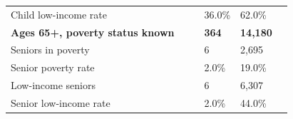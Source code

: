 \documentclass[9pt]{report}
\begin{document}
\begin{tabular}{p{.10in}p{.10in}p{.10in}p{3.7in}>{\hfill}p{.85in}>{\hfill}p{.85in}>{\hfill}p{.85in}>{\hfill}p{.85in}p{0.1in}}
\multicolumn{4}{l}{\parbox{3.6in}{\strut\raggedright{{Child low-income rate}}\strut}} &  &  & 36.0\% & 62.0\% & \multicolumn{1}{l}{}  \\ 
\multicolumn{4}{l}{\parbox{3.5in}{\strut\raggedright{\textbf{Ages 65+, poverty status known}\strut}}} & \textbf{} & \textbf{} & \textbf{364} & \textbf{14,180} & \textbf{} \\ 
\multicolumn{4}{l}{\parbox{3.6in}{\strut\raggedright{{Seniors in poverty}}\strut}} &  &  & 6 & 2,695 & \multicolumn{1}{l}{}  \\ 
\multicolumn{4}{l}{\parbox{3.6in}{\strut\raggedright{{Senior poverty rate}}\strut}} &  &  & 2.0\% & 19.0\% & \multicolumn{1}{l}{}  \\ 
\multicolumn{4}{l}{\parbox{3.6in}{\strut\raggedright{{Low-income seniors}}\strut}} &  &  & 6 & 6,307 & \multicolumn{1}{l}{}  \\ 
\multicolumn{4}{l}{\parbox{3.6in}{\strut\raggedright{{Senior low-income rate}}\strut}} &  &  & 2.0\% & 44.0\% & \multicolumn{1}{l}{}  \\ 

\end{tabular}
\setlength{\tabcolsep}{6pt} %
\end{document}
